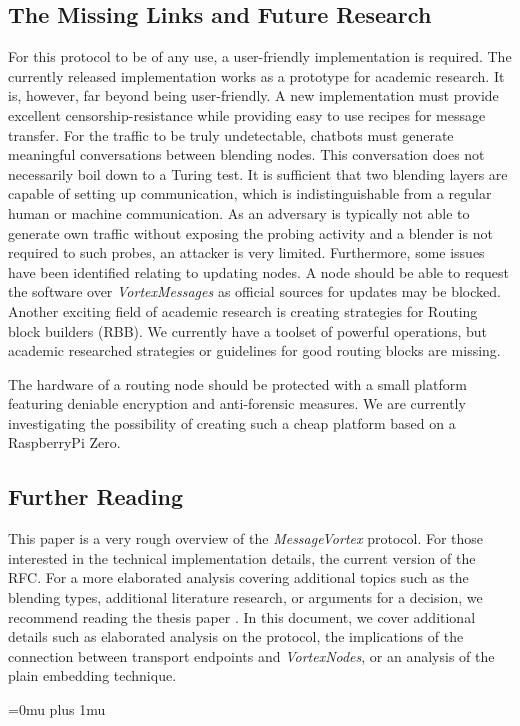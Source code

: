 \documentclass[acmsmall, screen]{acmart}
\begin{document}
\subsection{The Missing Links and Future Research}
For this protocol to be of any use, a user-friendly implementation is required. The currently released implementation works as a prototype for academic research. It is, however, far beyond being user-friendly. A new implementation must provide excellent censorship-resistance while providing easy to use recipes for message transfer.  For the traffic to be truly undetectable, chatbots must generate meaningful conversations between blending nodes. This conversation does not necessarily boil down to a Turing test. It is sufficient that two blending layers are capable of setting up communication, which is indistinguishable from a regular human or machine communication. As an adversary is typically not able to generate own traffic without exposing the probing activity and a blender is not required to such probes, an attacker is very limited. Furthermore, some issues have been identified relating to updating nodes. A node should be able to request the software over \emph{VortexMessages} as official sources for updates may be blocked. Another exciting field of academic research is creating strategies for Routing block builders (RBB). We currently have a toolset of powerful operations, but academic researched strategies or guidelines for good routing blocks are missing. 

The hardware of a routing node should be protected with a small platform featuring deniable encryption and anti-forensic measures. We are currently investigating the possibility of creating such a cheap platform based on a RaspberryPi Zero.

\subsection{Further Reading}
This paper is a very rough overview of the \emph{MessageVortex} protocol. For those interested in the technical implementation details, the current version of the RFC\cite{MessageVortexRFC}. For a more elaborated analysis covering additional topics such as the blending types, additional literature research, or arguments for a decision, we recommend reading the thesis paper \cite{messageVortex}. In this document, we cover additional details such as elaborated analysis on the protocol, the implications of the connection between transport endpoints and \emph{VortexNodes}, or an analysis of the plain embedding technique.



\Urlmuskip=0mu plus 1mu %

\end{document}

